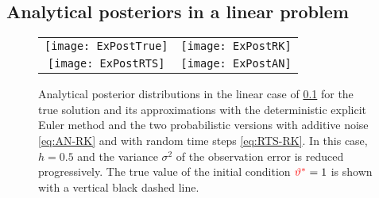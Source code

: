 \documentclass[10pt]{article}
\begin{document}
\subsection{Analytical posteriors in a linear problem}\label{sec:AnalyticalPosterior} 

\begin{figure}[t!]
	\begin{center}
		
		\vspace{0.2cm}
		\begin{tabular}{cc}
			\texttt{[image: ExPostTrue]} & \texttt{[image: ExPostRK]} \\[10pt] 
			\texttt{[image: ExPostRTS]}  & \texttt{[image: ExPostAN]}
		\end{tabular}	
	\end{center}
	\caption{Analytical posterior distributions in the linear case of \cref{sec:AnalyticalPosterior} for the true solution and its approximations with the deterministic explicit Euler method and the two probabilistic versions with additive noise \eqref{eq:AN-RK} and with random time steps \eqref{eq:RTS-RK}. In this case, $h = 0.5$ and the variance $\sigma^2$ of the observation error is reduced progressively. The true value of the initial condition ${\color{red}\vartheta^*} = 1$ is shown with a vertical black dashed line.}
	\label{fig:AnalyticalPosterior}
\end{figure}
\end{document}
